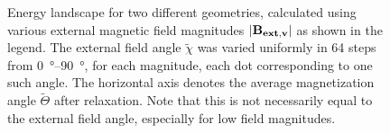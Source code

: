 \documentclass[11pt,a4paper,english]{article}
\begin{document}
\begin{figure}
\begin{subfigure}[b]{0.8\textwidth}
         \label{fig:barrierLandscape-sweepBext_r0.482}
     \end{subfigure}
    \caption{Energy landscape for two different geometries, calculated using various external magnetic field magnitudes $\abs{\vb{B_{ext,v}}}$ as shown in the legend. The external field angle $\widetilde{\chi}$ was varied uniformly in 64 steps from \SIrange{0}{90}{\degree}, for each magnitude, each dot corresponding to one such angle. The horizontal axis denotes the average magnetization angle $\widetilde{\Theta}$ after relaxation. Note that this is not necessarily equal to the external field angle, especially for low field magnitudes.}
    \label{fig:barrierLandscape-sweepBext}
\end{figure}

\end{document}

